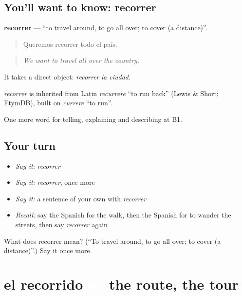 \subsection*{You'll want to know: recorrer}
\textbf{recorrer} — \textquotedblleft{}to travel around, to go all over; to cover (a distance)\textquotedblright{}.

\begin{quote}
Queremos recorrer todo el país.
\end{quote}

\begin{quote}
\emph{We want to travel all over the country.}
\end{quote}

It takes a direct object: \emph{recorrer la ciudad}.

\begin{cousinweb}
\emph{recorrer} is inherited from Latin \emph{recurrere} \textquotedblleft{}to run back\textquotedblright{} (Lewis \& Short; EtymDB), built on \emph{currere} \textquotedblleft{}to run\textquotedblright{}.
\end{cousinweb}

\begin{grammarlens}[title={What you've built}]
One more word for telling, explaining and describing at B1.
\end{grammarlens}

\subsection*{Your turn}
\begin{itemize}
\raggedright
  \item \emph{Say it:} \emph{recorrer}
  \item \emph{Say it:} \emph{recorrer}, once more
  \item \emph{Say it:} a sentence of your own with \emph{recorrer}
  \item \emph{Recall:} say the Spanish for the walk, then the Spanish for to wander the streets, then say \emph{recorrer} again
\end{itemize}

\begin{tcolorbox}[breakable,colback=teal!4,colframe=teal!35!black,title={Before you move on}]
What does recorrer mean? (\textquotedblleft{}To travel around, to go all over; to cover (a distance)\textquotedblright{}.) Say it once more.
\end{tcolorbox}
\section[el recorrido]{el recorrido — the route, the tour}


